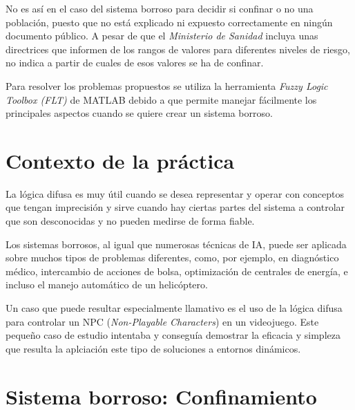 \documentclass[12pt,a4paper, xcolor=table]{article}
\begin{document}
\vspace{2mm}

No es así en el caso del sistema borroso para decidir si confinar o no una población, puesto que no está explicado ni expuesto correctamente en ningún documento público. A pesar de que el \textit{Ministerio de Sanidad}\cite{poblacion} incluya unas directrices que informen de los rangos de valores para diferentes niveles de riesgo, no indica a partir de cuales de esos valores se ha de confinar.

\vspace{4mm}

Para resolver los problemas propuestos se utiliza la herramienta \textit{Fuzzy Logic Toolbox (FLT)} de MATLAB debido a que permite manejar fácilmente los principales aspectos cuando se quiere crear un sistema borroso.

\newpage

\section{Contexto de la práctica}

La lógica difusa es muy útil cuando se desea representar y operar con conceptos que tengan imprecisión y sirve cuando hay ciertas partes del sistema a controlar que son desconocidas y no pueden medirse de forma fiable.

\vspace{3mm}

Los sistemas borrosos, al igual que numerosas técnicas de IA, puede ser aplicada sobre muchos tipos de problemas diferentes, como, por ejemplo, en diagnóstico médico, intercambio de acciones de bolsa, optimización de centrales de energía, e incluso el manejo automático de un helicóptero\cite{fuzzy}.

\vspace{2mm}

Un caso que puede resultar especialmente llamativo es el uso de la lógica difusa para controlar un NPC (\textit{Non-Playable Characters}) en un videojuego\cite{fuzzygame}. Este pequeño caso de estudio intentaba y conseguía demostrar la eficacia y simpleza que resulta la aplciación este tipo de soluciones a entornos dinámicos.

\vspace{2mm}




\section{Sistema borroso: Confinamiento}
\end{document}
